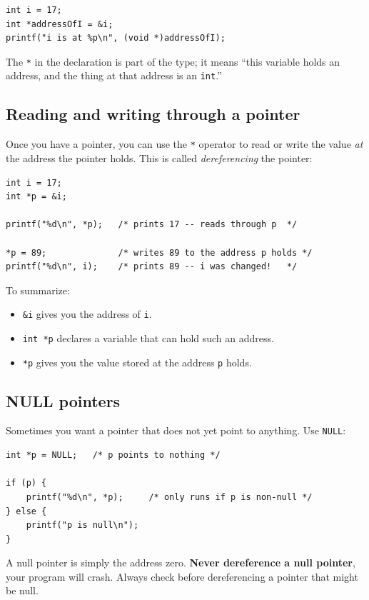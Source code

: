 \begin{verbatim}
int i = 17;
int *addressOfI = &i;
printf("i is at %p\n", (void *)addressOfI);
\end{verbatim}

The \texttt{*} in the declaration is part of the type; it means ``this
variable holds an address, and the thing at that address is an
\texttt{int}.''

\subsection{Reading and writing through a pointer}

Once you have a pointer, you can use the \texttt{*} operator to read
or write the value \emph{at} the address the pointer holds.  This is
called \emph{dereferencing} the pointer:

\begin{verbatim}
int i = 17;
int *p = &i;

printf("%d\n", *p);   /* prints 17 -- reads through p  */

*p = 89;              /* writes 89 to the address p holds */
printf("%d\n", i);    /* prints 89 -- i was changed!   */
\end{verbatim}

To summarize:
\begin{itemize}
\item \texttt{\&i} gives you the address of \texttt{i}.
\item \texttt{int *p} declares a variable that can hold such an address.
\item \texttt{*p} gives you the value stored at the address \texttt{p} holds.
\end{itemize}

\subsection{NULL pointers}

Sometimes you want a pointer that does not yet point to anything.  Use
\texttt{NULL}:

\begin{verbatim}
int *p = NULL;   /* p points to nothing */

if (p) {
    printf("%d\n", *p);     /* only runs if p is non-null */
} else {
    printf("p is null\n");
}
\end{verbatim}

A null pointer is simply the address zero.  \textbf{Never dereference
a null pointer}, your program will crash.  Always check before
dereferencing a pointer that might be null.

